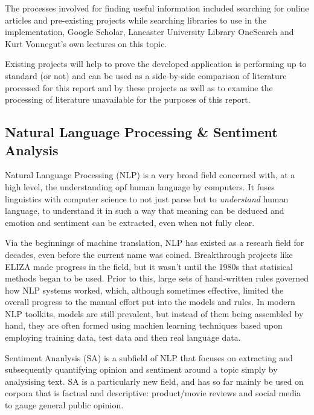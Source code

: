 \documentclass{article}
\begin{document}
        The processes involved for finding useful information included searching for online articles and pre-existing projects while searching libraries to use in the implementation, Google Scholar, Lancaster University Library OneSearch and Kurt Vonnegut’s own lectures on this topic.

        Existing projects will help to prove the developed application is performing up to standard (or not) and can be used as a side-by-side comparison of literature processed for this report and by these projects as well as to examine the processing of literature unavailable for the purposes of this report.
    \subsection{Natural Language Processing \& Sentiment Analysis}
        Natural Language Processing (NLP) is a very broad field concerned with, at a high level, the understanding opf human language by computers. It fuses linguistics with computer science to not just parse but to \emph{understand} human language, to understand it in such a way that meaning can be deduced and emotion and sentiment can be extracted, even when not fully clear.

        Via the beginnings of machine translation, NLP has existed as a researh field for decades, even before the current name was coined. Breakthrough projects like ELIZA made progress in the field, but it wasn't until the 1980s that statisical methods began to be used. Prior to this, large sets of hand-written rules governed how NLP systems worked, which, although sometimes effective, limited the overall progress to the manual effort put into the models and rules. In modern NLP toolkits, models are still prevalent, but instead of them being assembled by hand, they are often formed using machien learning techniques based upon employing training data, test data and then real language data.

        Sentiment Ananlysis (SA) is a subfield of NLP that focuses on extracting and subsequently quantifying opinion and sentiment around a topic simply by analysising text. SA is a particularly new field, and has so far mainly be used on corpora that is factual and descriptive: product/movie reviews and social media to gauge general public opinion.
\end{document}
